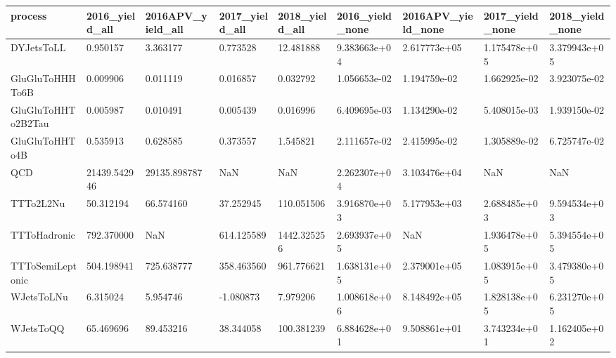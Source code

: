\begin{tabular}{lllllllll}
\toprule
           process & 2016\_yield\_all & 2016APV\_yield\_all & 2017\_yield\_all & 2018\_yield\_all & 2016\_yield\_none & 2016APV\_yield\_none & 2017\_yield\_none & 2018\_yield\_none \\
\midrule
        DYJetsToLL &       0.950157 &          3.363177 &       0.773528 &      12.481888 &    9.383663e+04 &       2.617773e+05 &    1.175478e+05 &    3.379943e+05 \\
   GluGluToHHHTo6B &       0.009906 &          0.011119 &       0.016857 &       0.032792 &    1.056653e-02 &       1.194759e-02 &    1.662925e-02 &    3.923075e-02 \\
GluGluToHHTo2B2Tau &       0.005987 &          0.010491 &       0.005439 &       0.016996 &    6.409695e-03 &       1.134290e-02 &    5.408015e-03 &    1.939150e-02 \\
    GluGluToHHTo4B &       0.535913 &          0.628585 &       0.373557 &       1.545821 &    2.111657e-02 &       2.415995e-02 &    1.305889e-02 &    6.725747e-02 \\
               QCD &   21439.542946 &      29135.898787 &            NaN &            NaN &    2.262307e+04 &       3.103476e+04 &             NaN &             NaN \\
         TTTo2L2Nu &      50.312194 &         66.574160 &      37.252945 &     110.051506 &    3.916870e+03 &       5.177953e+03 &    2.688485e+03 &    9.594534e+03 \\
      TTToHadronic &     792.370000 &               NaN &     614.125589 &    1442.325256 &    2.693937e+05 &                NaN &    1.936478e+05 &    5.394554e+05 \\
  TTToSemiLeptonic &     504.198941 &        725.638777 &     358.463560 &     961.776621 &    1.638131e+05 &       2.379001e+05 &    1.083915e+05 &    3.479380e+05 \\
        WJetsToLNu &       6.315024 &          5.954746 &      -1.080873 &       7.979206 &    1.008618e+06 &       8.148492e+05 &    1.828138e+05 &    6.231270e+05 \\
         WJetsToQQ &      65.469696 &         89.453216 &      38.344058 &     100.381239 &    6.884628e+01 &       9.508861e+01 &    3.743234e+01 &    1.162405e+02 \\
\bottomrule
\end{tabular}
